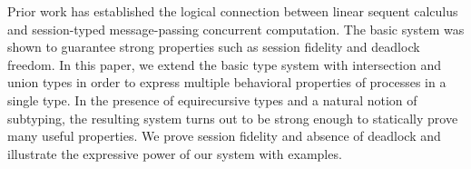 Prior work has established the logical connection between linear sequent calculus and session-typed message-passing concurrent computation. The basic system was shown to guarantee strong properties such as session fidelity and deadlock freedom. In this paper, we extend the basic type system with intersection and union types in order to express multiple behavioral properties of processes in a single type. In the presence of equirecursive types and a natural notion of subtyping, the resulting system turns out to be strong enough to statically prove many useful properties. We prove session fidelity and absence of deadlock and illustrate the expressive power of our system with examples.
